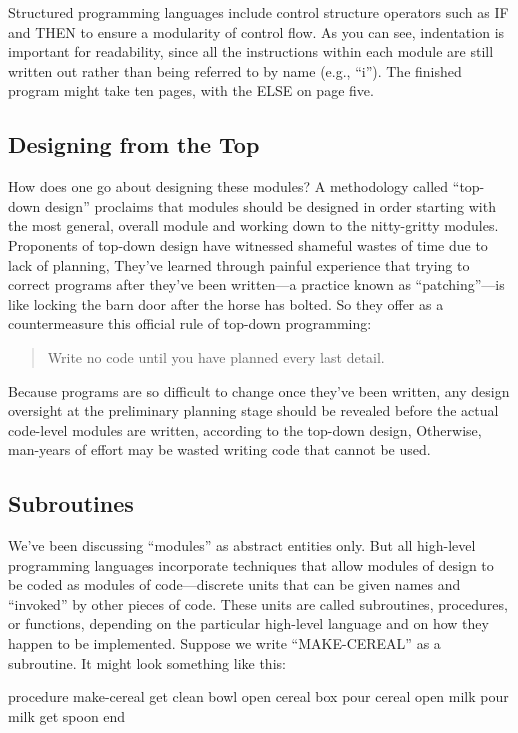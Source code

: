 
Structured programming languages include control structure operators
such as IF and THEN to ensure a modularity of control flow. As you
can see, indentation is important for readability, since all the instructions
within each module are still written out rather than being referred
to by name (e.g., ``i''). The finished program might take ten pages,
with the ELSE on page five.


\subsection{Designing from the Top}
How does one go about designing these modules? A methodology called
``top-down design'' proclaims that modules should be designed in order
starting with the most general, overall module and working down to
the nitty-gritty modules. Proponents of top-down design have witnessed
shameful wastes of time due to lack of planning, They've learned through
painful experience that trying to correct programs after they've been
written---a practice known as {}``patching''---is like locking the
barn door after the horse has bolted. So they offer as a countermeasure
this official rule of top-down programming:

\begin{quote}
Write no code until you have planned every last detail.
\end{quote}
Because programs are so difficult to change once they've been written,
any design oversight at the preliminary planning stage should be revealed
before the actual code-level modules are written, according to the
top-down design, Otherwise, man-years of effort may be wasted writing
code that cannot be used.


\subsection{Subroutines}
We've been discussing {}``modules'' as abstract entities only. But
all high-level programming languages incorporate techniques that allow
modules of design to be coded as modules of code---discrete units
that can be given names and ``invoked'' by other pieces of code. These
units are called subroutines, procedures, or functions, depending
on the particular high-level language and on how they happen to be
implemented. Suppose we write {}``MAKE-CEREAL'' as a subroutine.
It might look something like this:

\begin{Code}[fontfamily=cmss]
procedure make-cereal
   get clean bowl
   open cereal box
   pour cereal
   open milk
   pour milk
   get spoon
end
\end{Code}

